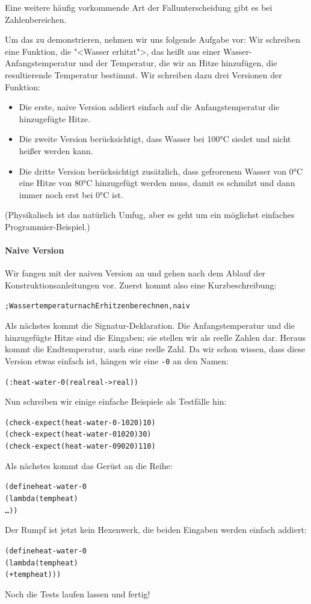 Eine weitere häufig vorkommende Art der Fallunterscheidung gibt es bei
Zahlenbereichen.

Um das zu demonstrieren, nehmen wir uns folgende Aufgabe vor: Wir
schreiben eine Funktion, die "<Wasser erhitzt">, das heißt aus einer
Wasser-Anfangstemperatur und der Temperatur, die wir an Hitze hinzufügen, die
resultierende Temperatur bestimmt.  Wir schreiben dazu drei Versionen der
Funktion:
%
\begin{itemize}
\item Die erste, naive Version addiert einfach auf die
  Anfangstemperatur die hinzugefügte Hitze.
\item Die zweite Version berücksichtigt, dass Wasser bei 100°C siedet
  und nicht heißer werden kann.
\item Die dritte Version berücksichtigt zusätzlich, dass gefrorenem
  Wasser von 0°C eine Hitze von 80°C hinzugefügt werden muss, damit es
  schmilzt und dann immer noch erst bei 0°C ist.
\end{itemize}
%
(Physikalisch ist das natürlich Umfug, aber es geht
um ein möglichst einfaches Programmier-Beispiel.)

\paragraph{Naive Version} Wir fangen mit der naiven Version an und gehen nach dem Ablauf der
Konstruktionsanleitungen vor.  Zuerst kommt also eine
Kurzbeschreibung:
%
\begin{alltt}
; Wassertemperatur nach Erhitzen berechnen, naiv
\end{alltt}
%
Als nächstes kommt die Signatur-Deklaration.  Die Anfangstemperatur
und die hinzugefügte Hitze sind die Eingaben; sie stellen wir als
reelle Zahlen dar.  Heraus kommt die Endtemperatur, auch eine reelle
Zahl.  Da wir schon wissen, dass diese Version etwas einfach ist,
hängen wir eine \texttt{-0} an den Namen:
%
\begin{alltt}
(: heat-water-0 (real real -> real))
\end{alltt}                
%
Nun schreiben wir einige einfache Beispiele als Testfälle hin:
%
\begin{alltt}
(check-expect (heat-water-0 -10 20) 10)
(check-expect (heat-water-0 10 20) 30)
(check-expect (heat-water-0 90 20) 110)
\end{alltt}
%
Als nächstes kommt das Gerüst an die Reihe:
%
\begin{alltt}
(define heat-water-0
  (lambda (temp heat)
    \ldots))
\end{alltt}
%
Der Rumpf ist jetzt kein Hexenwerk, die beiden Eingaben werden
einfach addiert:
%
\begin{alltt}
(define heat-water-0
  (lambda (temp heat)
    (+ temp heat)))
\end{alltt}
%
Noch die Tests laufen lassen und fertig!

